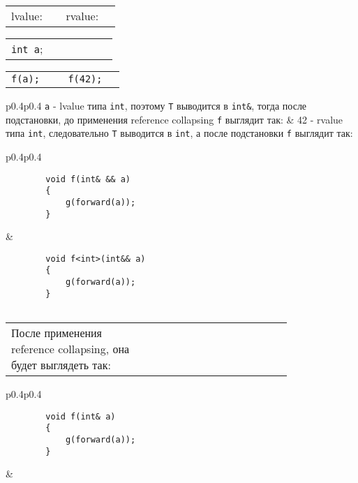 \begin{center}
	\begin{tabular}{p{0.4\linewidth}p{0.4\linewidth}}
		lvalue: & rvalue:\\
	\end{tabular}
	
	\begin{tabular}{p{0.4\linewidth}p{0.4\linewidth}}
		\texttt{int a}; & \vspace{\baselineskip}\\
	\end{tabular}
	
	\begin{tabular}{p{0.4\linewidth}p{0.4\linewidth}}
		\texttt{f(a);} & \texttt{f(42);}\\
	\end{tabular}
	
	\begin{tabular}{p{0.4\linewidth}p{0.4\linewidth}}
		\texttt{a} - lvalue типа \texttt{int}, поэтому \texttt{T} выводится в \texttt{int&}, тогда после подстановки, до применения reference collapsing \texttt{f} выглядит так: & 42 - rvalue типа \texttt{int}, следовательно \texttt{T} выводится в \texttt{int}, а после подстановки \texttt{f} выглядит так:\\
	\end{tabular}
	
	\begin{tabular}{p{0.4\linewidth}p{0.4\linewidth}}
		\begin{verbatim}
		void f(int& && a)
		{
		    g(forward(a));
		}
		\end{verbatim}
		&
		\begin{verbatim}
		void f<int>(int&& a)
		{
		    g(forward(a));
		}
		
		\end{verbatim}
	\end{tabular}
	
	\begin{tabular}{p{0.4\linewidth}p{0.4\linewidth}}
		После применения reference collapsing, она будет выглядеть так:
		& \vspace{\baselineskip}\\
	\end{tabular}
	
	\begin{tabular}{p{0.4\linewidth}p{0.4\linewidth}}
		\begin{verbatim}
		void f(int& a)
		{
		    g(forward(a));
		}
		\end{verbatim}
		& \vspace{\baselineskip}\\
	\end{tabular}
	

\end{center}
